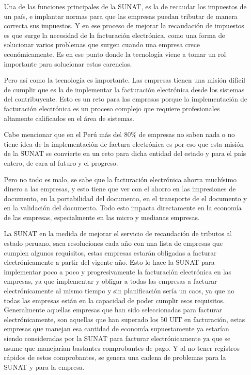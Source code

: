 \documentclass[12pt,a4paper,openany,oneside]{book}
\begin{document}
    Una de las funciones principales de la SUNAT, es la de recaudar los impuestos de un país, e implantar normas para que las empresas puedan tributar de manera correcta sus impuestos. Y en ese proceso de mejorar la recaudación de impuestos es que surge la necesidad de la facturación electrónica, como una forma de solucionar varios problemas que surgen cuando una empresa crece económicamente. Es en ese punto donde la tecnología viene a tomar un rol importante para solucionar estas carencias.

    Pero así como la tecnología es importante. Las empresas tienen una misión difícil de cumplir que es la de implementar la facturación electrónica desde los sistemas del contribuyente. Esto es un reto para las empresas porque la implementación de facturación electrónica es un proceso complejo que requiere profesionales altamente calificados en el área de sistemas. 

    Cabe mencionar que en el Perú más del 80\% de empresas no saben nada o no tiene idea de la implementación de factura electrónica es por eso que esta misión de la SUNAT se convierte en un reto para dicha entidad del estado y para el país entero, de cara al futuro y el progreso. 

    Pero no todo es malo, se sabe que la facturación electrónica ahorra muchísimo dinero a las empresas, y esto tiene que ver con el ahorro en las impresiones de documento, en la portabilidad del documento, en el transporte de el documento y en la validación del documento. Todo esto impacta directamente en la economía de las empresas, especialmente en las micro y medianas empresas. 

    La SUNAT en la medida de mejorar el servicio de recaudación de tributos al estado peruano, saca resoluciones cada año con una lista de empresas que cumplen algunos requisitos, estas empresas estarán obligadas a facturar electrónicamente a partir del vigente año. Esto lo hace la SUNAT para implementar poco a poco y progresivamente la facturación electrónica en las empresas, ya que implementar y obligar a todas las empresas a facturar electrónicamente al mismo tiempo y sin planificación sería un caos, ya que no todas las empresas están en la capacidad de poder cumplir esos requisitos.
    Generalmente aquellas empresas que han sido seleccionadas para facturar electrónicamente, son aquellas que han superado los 50 UIT en facturación, estas empresas que manejan esa cantidad de economía supuestamente ya estarían siendo consideradas por la SUNAT para facturar electrónicamente ya que se asume que manejarían bastantes comprobantes de pago. Y al no tener registros rápidos de estos comprobantes, se genera una cadena de problemas para la SUNAT y para la empresa.
\end{document}
